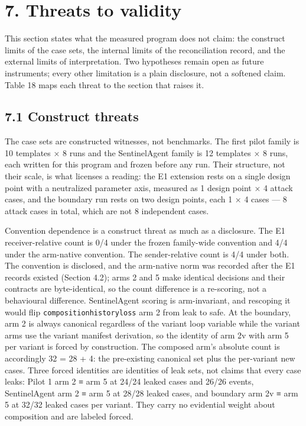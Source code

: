 \documentclass[
  10pt,
]{article}
\let\origtexttt\texttt
\renewcommand{\texttt}[1]{{\upshape\origtexttt{#1}}}
\renewcommand{\_}{\allowbreak\origunderscore}
\begin{document}
\section{7. Threats to validity}\label{threats-to-validity}

This section states what the measured program does not claim: the
construct limits of the case sets, the internal limits of the
reconciliation record, and the external limits of interpretation. Two
hypotheses remain open as future instruments; every other limitation is
a plain disclosure, not a softened claim. Table 18 maps each threat to
the section that raises it.

\subsection{7.1 Construct threats}\label{construct-threats}

The case sets are constructed witnesses, not benchmarks. The first pilot
family is 10 templates × 8 runs and the SentinelAgent family is 12
templates × 8 runs, each written for this program and frozen before any
run. Their structure, not their scale, is what licenses a reading: the
E1 extension rests on a single design point with a neutralized parameter
axis, measured as 1 design point × 4 attack cases, and the boundary run
rests on two design points, each 1 × 4 cases --- 8 attack cases in
total, which are not 8 independent cases.

Convention dependence is a construct threat as much as a disclosure. The
E1 receiver-relative count is 0/4 under the frozen family-wide
convention and 4/4 under the arm-native convention. The sender-relative
count is 4/4 under both. The convention is disclosed, and the arm-native
norm was recorded after the E1 records existed (Section 4.2); arms 2 and
5 make identical decisions and their contracts are byte-identical, so
the count difference is a re-scoring, not a behavioural difference.
SentinelAgent scoring is arm-invariant, and rescoping it would flip
\texttt{composition\_history\_loss} arm 2 from leak to safe. At the
boundary, arm 2 is always canonical regardless of the variant loop
variable while the variant arms use the variant manifest derivation, so
the identity of arm 2v with arm 5 per variant is forced by construction.
The composed arm's absolute count is accordingly 32 = 28 + 4: the
pre-existing canonical set plus the per-variant new cases. Three forced
identities are identities of leak sets, not claims that every case
leaks: Pilot 1 arm 2 ≡ arm 5 at 24/24 leaked cases and 26/26 events,
SentinelAgent arm 2 ≡ arm 5 at 28/28 leaked cases, and boundary arm 2v ≡
arm 5 at 32/32 leaked cases per variant. They carry no evidential weight
about composition and are labeled forced.
\end{document}

